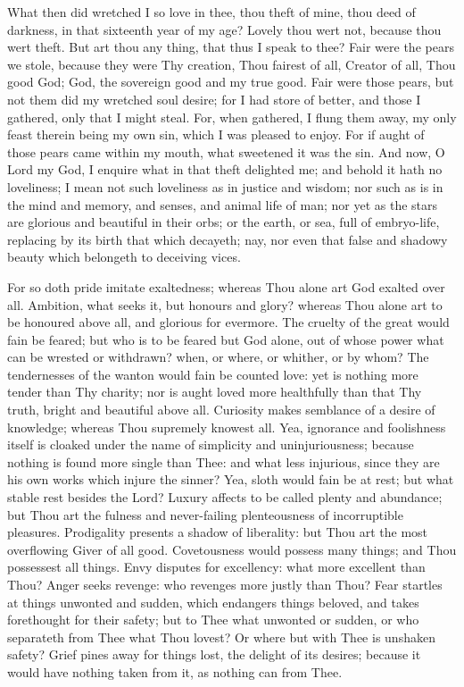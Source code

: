 \documentclass[b5paper,openright,12pt,twoside]{book}
\begin{document}
What then did wretched I so love in thee, thou theft of mine, thou deed
of darkness, in that sixteenth year of my age? Lovely thou wert not,
because thou wert theft. But art thou any thing, that thus I speak to
thee? Fair were the pears we stole, because they were Thy creation, Thou
fairest of all, Creator of all, Thou good God; God, the sovereign good
and my true good. Fair were those pears, but not them did my wretched
soul desire; for I had store of better, and those I gathered, only that
I might steal. For, when gathered, I flung them away, my only feast
therein being my own sin, which I was pleased to enjoy. For if aught
of those pears came within my mouth, what sweetened it was the sin.
And now, O Lord my God, I enquire what in that theft delighted me; and
behold it hath no loveliness; I mean not such loveliness as in justice
and wisdom; nor such as is in the mind and memory, and senses, and
animal life of man; nor yet as the stars are glorious and beautiful in
their orbs; or the earth, or sea, full of embryo-life, replacing by its
birth that which decayeth; nay, nor even that false and shadowy beauty
which belongeth to deceiving vices.

For so doth pride imitate exaltedness; whereas Thou alone art God
exalted over all. Ambition, what seeks it, but honours and glory?
whereas Thou alone art to be honoured above all, and glorious for
evermore. The cruelty of the great would fain be feared; but who is
to be feared but God alone, out of whose power what can be wrested or
withdrawn? when, or where, or whither, or by whom? The tendernesses of
the wanton would fain be counted love: yet is nothing more tender than
Thy charity; nor is aught loved more healthfully than that Thy truth,
bright and beautiful above all. Curiosity makes semblance of a desire
of knowledge; whereas Thou supremely knowest all. Yea, ignorance
and foolishness itself is cloaked under the name of simplicity and
uninjuriousness; because nothing is found more single than Thee: and
what less injurious, since they are his own works which injure the
sinner? Yea, sloth would fain be at rest; but what stable rest besides
the Lord? Luxury affects to be called plenty and abundance; but Thou art
the fulness and never-failing plenteousness of incorruptible pleasures.
Prodigality presents a shadow of liberality: but Thou art the most
overflowing Giver of all good. Covetousness would possess many things;
and Thou possessest all things. Envy disputes for excellency: what more
excellent than Thou? Anger seeks revenge: who revenges more justly
than Thou? Fear startles at things unwonted and sudden, which endangers
things beloved, and takes forethought for their safety; but to Thee what
unwonted or sudden, or who separateth from Thee what Thou lovest? Or
where but with Thee is unshaken safety? Grief pines away for things
lost, the delight of its desires; because it would have nothing taken
from it, as nothing can from Thee.
\end{document}

